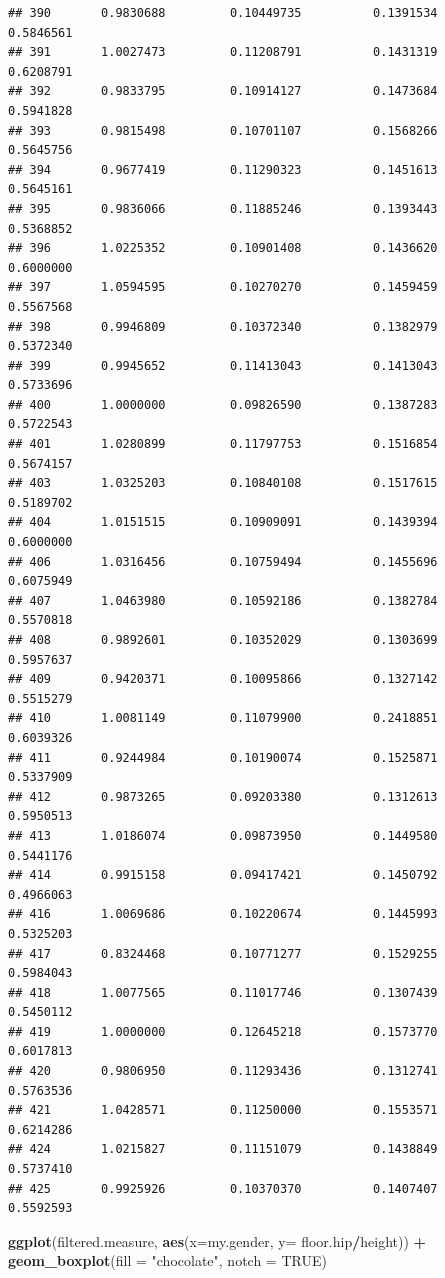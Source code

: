 \documentclass[]{article}
\newenvironment{Shaded}{\begin{snugshade}}{\end{snugshade}}
\newcommand{\DataTypeTok}[1]{\textcolor[rgb]{0.13,0.29,0.53}{#1}}
\newcommand{\KeywordTok}[1]{\textcolor[rgb]{0.13,0.29,0.53}{\textbf{#1}}}
\newcommand{\NormalTok}[1]{#1}
\newcommand{\OperatorTok}[1]{\textcolor[rgb]{0.81,0.36,0.00}{\textbf{#1}}}
\newcommand{\OtherTok}[1]{\textcolor[rgb]{0.56,0.35,0.01}{#1}}
\newcommand{\StringTok}[1]{\textcolor[rgb]{0.31,0.60,0.02}{#1}}
\begin{document}
\begin{verbatim}
## 390       0.9830688         0.10449735          0.1391534        0.5846561
## 391       1.0027473         0.11208791          0.1431319        0.6208791
## 392       0.9833795         0.10914127          0.1473684        0.5941828
## 393       0.9815498         0.10701107          0.1568266        0.5645756
## 394       0.9677419         0.11290323          0.1451613        0.5645161
## 395       0.9836066         0.11885246          0.1393443        0.5368852
## 396       1.0225352         0.10901408          0.1436620        0.6000000
## 397       1.0594595         0.10270270          0.1459459        0.5567568
## 398       0.9946809         0.10372340          0.1382979        0.5372340
## 399       0.9945652         0.11413043          0.1413043        0.5733696
## 400       1.0000000         0.09826590          0.1387283        0.5722543
## 401       1.0280899         0.11797753          0.1516854        0.5674157
## 403       1.0325203         0.10840108          0.1517615        0.5189702
## 404       1.0151515         0.10909091          0.1439394        0.6000000
## 406       1.0316456         0.10759494          0.1455696        0.6075949
## 407       1.0463980         0.10592186          0.1382784        0.5570818
## 408       0.9892601         0.10352029          0.1303699        0.5957637
## 409       0.9420371         0.10095866          0.1327142        0.5515279
## 410       1.0081149         0.11079900          0.2418851        0.6039326
## 411       0.9244984         0.10190074          0.1525871        0.5337909
## 412       0.9873265         0.09203380          0.1312613        0.5950513
## 413       1.0186074         0.09873950          0.1449580        0.5441176
## 414       0.9915158         0.09417421          0.1450792        0.4966063
## 416       1.0069686         0.10220674          0.1445993        0.5325203
## 417       0.8324468         0.10771277          0.1529255        0.5984043
## 418       1.0077565         0.11017746          0.1307439        0.5450112
## 419       1.0000000         0.12645218          0.1573770        0.6017813
## 420       0.9806950         0.11293436          0.1312741        0.5763536
## 421       1.0428571         0.11250000          0.1553571        0.6214286
## 424       1.0215827         0.11151079          0.1438849        0.5737410
## 425       0.9925926         0.10370370          0.1407407        0.5592593
\end{verbatim}

\begin{Shaded}
\begin{Highlighting}[]
\KeywordTok{ggplot}\NormalTok{(filtered.measure, }\KeywordTok{aes}\NormalTok{(}\DataTypeTok{x=}\NormalTok{my.gender, }\DataTypeTok{y=}\NormalTok{ floor.hip}\OperatorTok{/}\NormalTok{height)) }\OperatorTok{+}
\StringTok{  }\KeywordTok{geom\_boxplot}\NormalTok{(}\DataTypeTok{fill =} \StringTok{"chocolate"}\NormalTok{, }\DataTypeTok{notch =} \OtherTok{TRUE}\NormalTok{)}
\end{Highlighting}
\end{Shaded}
\end{document}

